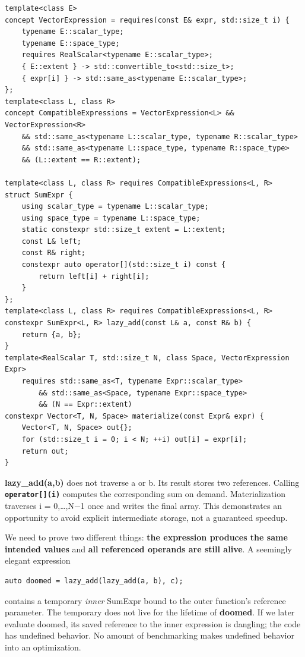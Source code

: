 \begin{verbatim}
template<class E>
concept VectorExpression = requires(const E& expr, std::size_t i) {
    typename E::scalar_type;
    typename E::space_type;
    requires RealScalar<typename E::scalar_type>;
    { E::extent } -> std::convertible_to<std::size_t>;
    { expr[i] } -> std::same_as<typename E::scalar_type>;
};
template<class L, class R>
concept CompatibleExpressions = VectorExpression<L> && VectorExpression<R>
    && std::same_as<typename L::scalar_type, typename R::scalar_type>
    && std::same_as<typename L::space_type, typename R::space_type>
    && (L::extent == R::extent);

template<class L, class R> requires CompatibleExpressions<L, R>
struct SumExpr {
    using scalar_type = typename L::scalar_type;
    using space_type = typename L::space_type;
    static constexpr std::size_t extent = L::extent;
    const L& left;
    const R& right;
    constexpr auto operator[](std::size_t i) const {
        return left[i] + right[i];
    }
};
template<class L, class R> requires CompatibleExpressions<L, R>
constexpr SumExpr<L, R> lazy_add(const L& a, const R& b) {
    return {a, b};
}
template<RealScalar T, std::size_t N, class Space, VectorExpression Expr>
    requires std::same_as<T, typename Expr::scalar_type>
        && std::same_as<Space, typename Expr::space_type>
        && (N == Expr::extent)
constexpr Vector<T, N, Space> materialize(const Expr& expr) {
    Vector<T, N, Space> out{};
    for (std::size_t i = 0; i < N; ++i) out[i] = expr[i];
    return out;
}
\end{verbatim}

\textbf{lazy\_add(a,b)} does not traverse a or b. Its result stores two references. Calling \textbf{\texttt{operator{[}{]}(i)}} computes the corresponding sum on demand. Materialization traverses i = 0,\ldots,N−1 once and writes the final array. This demonstrates an opportunity to avoid explicit intermediate storage, not a guaranteed speedup.

We need to prove two different things: \textbf{the expression produces the same intended values} and \textbf{all referenced operands are still alive}. A seemingly elegant expression

\begin{verbatim}
auto doomed = lazy_add(lazy_add(a, b), c);
\end{verbatim}

contains a temporary \emph{inner} SumExpr bound to the outer function's reference parameter. The temporary does not live for the lifetime of \textbf{doomed}. If we later evaluate doomed, its saved reference to the inner expression is dangling; the code has undefined behavior. No amount of benchmarking makes undefined behavior into an optimization.

